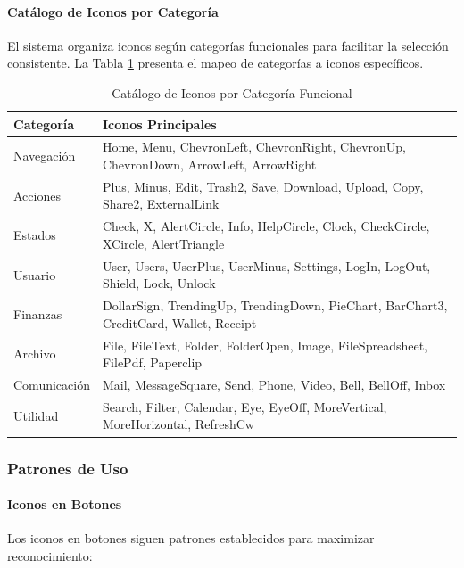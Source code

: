 \documentclass[12pt,a4paper,oneside]{article}
\begin{document}
\paragraph{Catálogo de Iconos por Categoría}
El sistema organiza iconos según categorías funcionales para facilitar la selección consistente. La Tabla \ref{tab:iconos-catalogo} presenta el mapeo de categorías a iconos específicos.

\begin{table}[h]
\centering
\caption{Catálogo de Iconos por Categoría Funcional}
\label{tab:iconos-catalogo}
\small
\begin{tabular}{|l|p{8cm}|}
\hline
\textbf{Categoría} & \textbf{Iconos Principales} \\
\hline
Navegación & Home, Menu, ChevronLeft, ChevronRight, ChevronUp, ChevronDown, ArrowLeft, ArrowRight \\
\hline
Acciones & Plus, Minus, Edit, Trash2, Save, Download, Upload, Copy, Share2, ExternalLink \\
\hline
Estados & Check, X, AlertCircle, Info, HelpCircle, Clock, CheckCircle, XCircle, AlertTriangle \\
\hline
Usuario & User, Users, UserPlus, UserMinus, Settings, LogIn, LogOut, Shield, Lock, Unlock \\
\hline
Finanzas & DollarSign, TrendingUp, TrendingDown, PieChart, BarChart3, CreditCard, Wallet, Receipt \\
\hline
Archivo & File, FileText, Folder, FolderOpen, Image, FileSpreadsheet, FilePdf, Paperclip \\
\hline
Comunicación & Mail, MessageSquare, Send, Phone, Video, Bell, BellOff, Inbox \\
\hline
Utilidad & Search, Filter, Calendar, Eye, EyeOff, MoreVertical, MoreHorizontal, RefreshCw \\
\hline
\end{tabular}
\end{table}

\subsubsection{Patrones de Uso}

\paragraph{Iconos en Botones}
Los iconos en botones siguen patrones establecidos para maximizar reconocimiento:
\end{document}
